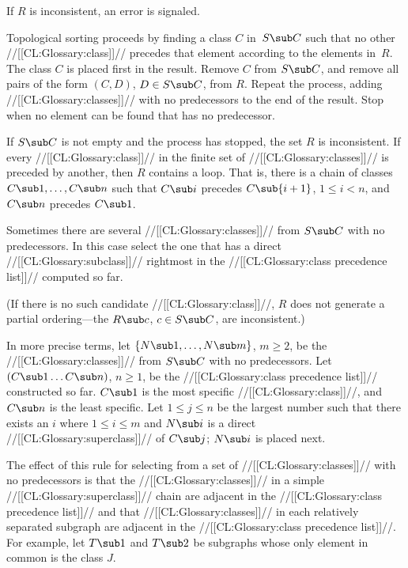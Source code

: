 If $R$ is inconsistent, an error is signaled.

\goodbreak


Topological sorting proceeds by finding a class $C$ in~$S\sub C$ such that no other //[[CL:Glossary:class]]// precedes that element according to the elements in~$R$\negthinspace.  The class $C$ is placed first in the result. Remove $C$ from $S\sub C$, and remove all pairs of the form $(C,D)$, $D\in S\sub C$, from $R$\negthinspace. Repeat the process, adding //[[CL:Glossary:classes]]// with no predecessors to the end of the result.  Stop when no element can be found that has no predecessor.

If $S\sub C$ is not empty and the process has stopped, the set $R$ is inconsistent. If every //[[CL:Glossary:class]]// in the finite set of  //[[CL:Glossary:classes]]// is preceded by another, then $R$ contains a loop. That is, there is a chain of classes $C\sub 1,\ldots,C\sub n$ such that $C\sub i$ precedes $C\sub{i+1}$, $1\leq i<n$, and $C\sub n$ precedes $C\sub 1$.

Sometimes there are several //[[CL:Glossary:classes]]// from $S\sub C$ with no predecessors.  In this case select the one that has a direct //[[CL:Glossary:subclass]]// rightmost in the //[[CL:Glossary:class precedence list]]// computed so far.

(If there is no such candidate //[[CL:Glossary:class]]//, $R$ does not generate  a partial ordering---the $R\sub c$, $c\in S\sub C$, are inconsistent.)

In more precise terms, let $\{N\sub 1,\ldots,N\sub m\}$, $m\geq 2$, be the //[[CL:Glossary:classes]]// from $S\sub C$ with no predecessors.  Let $(C\sub 1\ldots C\sub n)$, $n\geq 1$, be the //[[CL:Glossary:class precedence list]]// constructed so far.  $C\sub 1$ is the most specific //[[CL:Glossary:class]]//, and $C\sub n$ is the least specific.  Let $1\leq j\leq n$ be the largest number such that there exists an $i$ where $1\leq i\leq m$ and $N\sub i$ is a direct //[[CL:Glossary:superclass]]// of $C\sub j$; $N\sub i$ is placed next.

The effect of this rule for selecting from a set of //[[CL:Glossary:classes]]// with no predecessors is that the //[[CL:Glossary:classes]]// in a simple //[[CL:Glossary:superclass]]// chain are adjacent in the //[[CL:Glossary:class precedence list]]// and that //[[CL:Glossary:classes]]// in each relatively separated subgraph are adjacent in the //[[CL:Glossary:class precedence list]]//. For example, let $T\sub 1$ and $T\sub 2$ be subgraphs whose only element in common is the class $J$\negthinspace.

